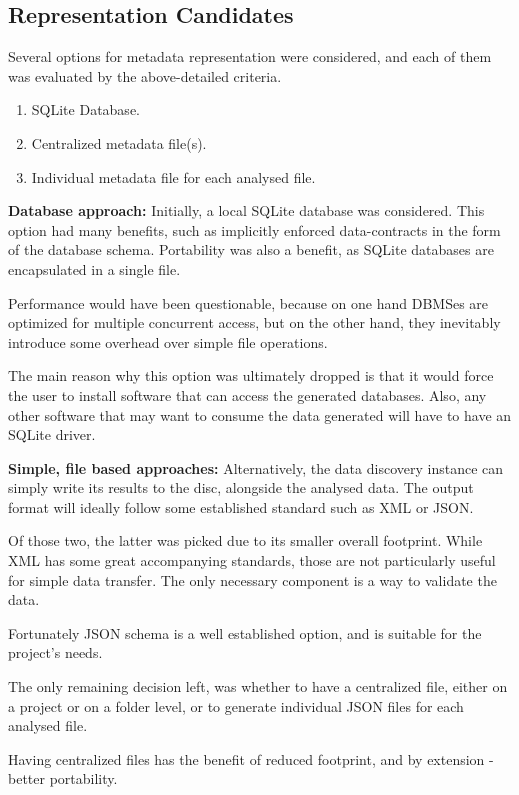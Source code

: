 \subsection{Representation Candidates}

Several options for metadata representation were considered, and each of them was evaluated by the above-detailed criteria.

\begin{enumerate}
    \item SQLite Database.
    \item Centralized metadata file(s).
    \item Individual metadata file for each analysed file.
\end{enumerate}

\textbf{Database approach:}
Initially, a local SQLite database was considered.
This option had many benefits, such as implicitly enforced data-contracts
in the form of the database schema.
Portability was also a benefit, as SQLite databases are encapsulated in a single file.

Performance would have been questionable, because on one hand DBMSes are optimized for multiple concurrent access,
but on the other hand, they inevitably introduce some overhead over simple file operations.

The main reason why this option was ultimately dropped is that it would force the user to install software that
can access the generated databases.
Also, any other software that may want to consume the data generated will have to have an SQLite driver.

\textbf{Simple, file based approaches:}
Alternatively, the data discovery instance can simply write its results
to the disc, alongside the analysed data.
The output format will ideally follow some established standard such as XML
or JSON.

Of those two, the latter was picked due to its smaller overall footprint.
While XML has some great accompanying standards,
those are not particularly useful for simple data transfer.
The only necessary component is a way to validate the data.

Fortunately JSON schema is a well established option, and is suitable for the project's needs.

The only remaining decision left, was whether to have a centralized file, either on a project or on a folder level,
or to generate individual JSON files for each analysed file.

Having centralized files has the benefit of reduced footprint, and by extension -
better portability.

